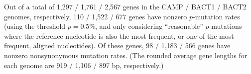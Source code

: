 Out of a total of 1,297 / 1,761 / 2,567 genes in the CAMP / BACT1 / BACT2 genomes, respectively, 110 / 1,522 / 677 genes have nonzero $p$-mutation rates (using the threshold $p=0.5\%$, and only considering ``reasonable'' $p$-mutations where the reference nucleotide is also the most frequent, or one of the most frequent, aligned nucleotides). Of these genes, 98 / 1,183 / 566 genes have nonzero nonsynonymous mutation rates. (The rounded average gene lengths for each genome are 919 / 1,106 / 897 bp, respectively.)\endinput
